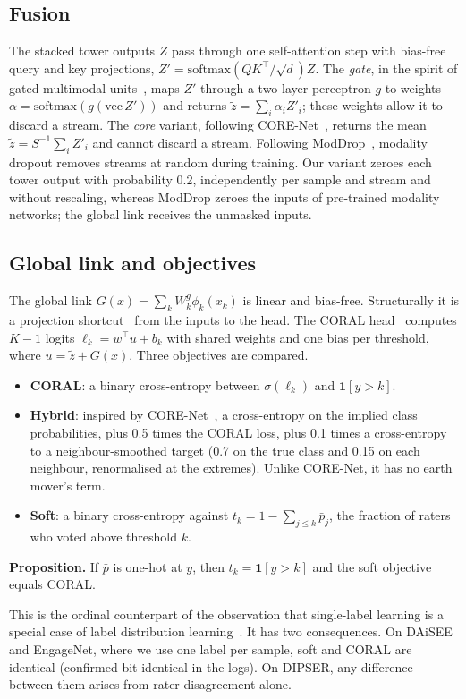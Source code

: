 \subsection{Fusion}
The stacked tower outputs $Z$ pass through one self-attention step with bias-free query and key projections, $Z'=\mathrm{softmax}(QK^\top/\sqrt{d})Z$. The \emph{gate}, in the spirit of gated multimodal units~\cite{arevalo2017gated}, maps $Z'$ through a two-layer perceptron $g$ to weights $\alpha=\mathrm{softmax}(g(\mathrm{vec}\,Z'))$ and returns $\tilde z=\sum_i\alpha_iZ'_i$; these weights allow it to discard a stream. The \emph{core} variant, following CORE-Net~\cite{tran2026ordinal}, returns the mean $\tilde z=S^{-1}\sum_iZ'_i$ and cannot discard a stream. Following ModDrop~\cite{neverova2016moddrop}, modality dropout removes streams at random during training. Our variant zeroes each tower output with probability 0.2, independently per sample and stream and without rescaling, whereas ModDrop zeroes the inputs of pre-trained modality networks; the global link receives the unmasked inputs.

\subsection{Global link and objectives}
The global link $G(x)=\sum_kW^{g}_k\phi_k(x_k)$ is linear and bias-free. Structurally it is a projection shortcut~\cite{he2016deep} from the inputs to the head. The CORAL head~\cite{cao2020coral} computes $K-1$ logits $\ell_k=w^\top u+b_k$ with shared weights and one bias per threshold, where $u=\tilde z+G(x)$. Three objectives are compared.
\begin{itemize}
\item \textbf{CORAL}: a binary cross-entropy between $\sigma(\ell_k)$ and $\mathbf{1}[y>k]$.
\item \textbf{Hybrid}: inspired by CORE-Net~\cite{tran2026ordinal}, a cross-entropy on the implied class probabilities, plus 0.5 times the CORAL loss, plus 0.1 times a cross-entropy to a neighbour-smoothed target (0.7 on the true class and 0.15 on each neighbour, renormalised at the extremes). Unlike CORE-Net, it has no earth mover's term.
\item \textbf{Soft}: a binary cross-entropy against $t_k=1-\sum_{j\le k}\bar p_j$, the fraction of raters who voted above threshold $k$.
\end{itemize}

\noindent\textbf{Proposition.} If $\bar p$ is one-hot at $y$, then $t_k=\mathbf{1}[y>k]$ and the soft objective equals CORAL.

This is the ordinal counterpart of the observation that single-label learning is a special case of label distribution learning~\cite{geng2016ldl}. It has two consequences. On DAiSEE and EngageNet, where we use one label per sample, soft and CORAL are identical (confirmed bit-identical in the logs). On DIPSER, any difference between them arises from rater disagreement alone.

